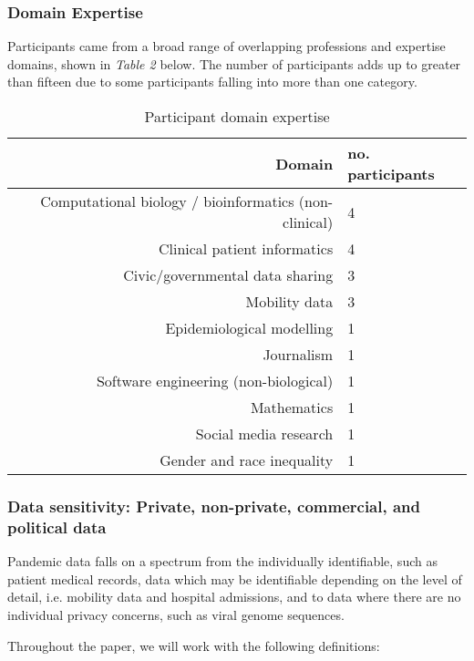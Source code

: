 \documentclass{CUP-JNL-DAP}%
\begin{document}
\subsubsection{Domain Expertise}

Participants came from a broad range of overlapping professions and expertise domains, shown in \textit{Table 2} below.  The number of participants adds up to greater than fifteen due to some participants falling into more than one category.  

\begin{table}[h!]
  \begin{center}
    \caption{Participant domain expertise}
    \label{tab:professions}
    \begin{tabular}{r|l} %
      \textbf{Domain} & \textbf{no. participants} \\
      \hline
      Computational biology / bioinformatics (non-clinical)  & 4\\
      Clinical patient informatics & 4\\
      Civic/governmental data sharing & 3 \\
      Mobility data & 3\\
      Epidemiological modelling & 1\\
      Journalism & 1\\
      Software engineering (non-biological) & 1\\
      Mathematics & 1\\      
      Social media research & 1\\      
      Gender and race inequality & 1\\      
    \end{tabular}
  \end{center}
\end{table}

\subsubsection{Data sensitivity: Private, non-private, commercial, and political data}

Pandemic data falls on a spectrum from the individually identifiable, such as patient medical records, data which may be identifiable depending on the level of detail, i.e. mobility data and hospital admissions, and to data where there are no individual privacy concerns, such as viral genome sequences.  

Throughout the paper, we will work with the following definitions: 
\end{document}
